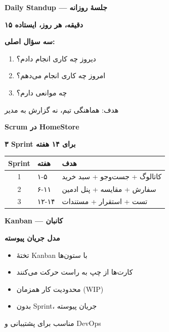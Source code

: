 \documentclass[14pt, a4paper, landscape]{extarticle}
\newcommand{\slide}[1]{%
    \newpage
    \begin{center}
    \begin{minipage}[t]{0.95\textwidth}
    \vspace{0.5cm}
    #1
    \vspace{0.5cm}
    \end{minipage}
    \end{center}
}
\newcommand{\slidetitle}[1]{%
    \begin{center}
        {\LARGE\bfseries\textcolor{primary}{#1}}
    \end{center}
    \vspace{0.5cm}
}
\newcommand{\myaccent}[1]{\textcolor{accent}{#1}}
\begin{document}
\slide{
    \slidetitle{Daily Standup — جلسهٔ روزانه}
    \vspace{0.3cm}
    \begin{center}
        {\large\bfseries ۱۵ دقیقه، هر روز، ایستاده}
    \end{center}
    \vspace{0.5cm}
    {\large\bfseries\textcolor{primary}{سه سؤال اصلی:}}
    \vspace{0.3cm}
    \begin{enumerate}[itemsep=0.5em]
        \item {\large دیروز چه کاری انجام دادم؟}
        \item {\large امروز چه کاری انجام می‌دهم؟}
        \item {\large چه موانعی دارم؟}
    \end{enumerate}
    \vspace{0.5cm}
    \begin{center}
        {\large\myaccent{هدف: هماهنگی تیم، نه گزارش به مدیر}}
    \end{center}
}



\slide{
    \slidetitle{Scrum در HomeStore}
    \vspace{0.5cm}
    \begin{center}
        {\large\bfseries ۳ Sprint برای ۱۴ هفته}
    \end{center}
    \vspace{0.8cm}
    \begin{center}
        \begin{tabular}{clp{6cm}}
            \toprule
            \textbf{Sprint} & \textbf{هفته} & \textbf{هدف} \\
            \midrule
            1 & ۱-۵ & کاتالوگ + جست‌وجو + سبد خرید \\
            \hline
            2 & ۶-۱۱ & سفارش + مقایسه + پنل ادمین \\
            \hline
            3 & ۱۲-۱۴ & تست + استقرار + مستندات \\
            \bottomrule
        \end{tabular}
    \end{center}
}


\slide{
    \slidetitle{Kanban — کانبان}
    \vspace{0.5cm}
    \begin{center}
        {\large\bfseries مدل جریان پیوسته}
    \end{center}
    \vspace{0.8cm}
    \begin{itemize}[itemsep=0.6em]
        \item {\large تختهٔ Kanban با ستون‌ها}
        \item {\large کارت‌ها از چپ به راست حرکت می‌کنند}
        \item {\large محدودیت کار همزمان (WIP)}
        \item {\large بدون Sprint، جریان پیوسته}
    \end{itemize}
    \vspace{0.8cm}
    \begin{center}
        {\myaccent{مناسب برای پشتیبانی و DevOps}}
    \end{center}
}
\end{document}
